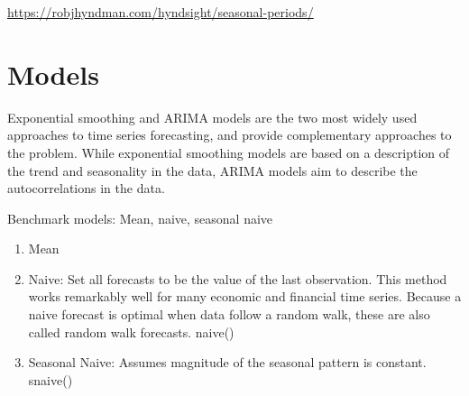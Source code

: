 \documentclass[]{book}
\newenvironment{Shaded}{\begin{snugshade}}{\end{snugshade}}
\newcommand{\KeywordTok}[1]{\textcolor[rgb]{0.13,0.29,0.53}{\textbf{#1}}}
\newcommand{\DataTypeTok}[1]{\textcolor[rgb]{0.13,0.29,0.53}{#1}}
\newcommand{\DecValTok}[1]{\textcolor[rgb]{0.00,0.00,0.81}{#1}}
\newcommand{\FloatTok}[1]{\textcolor[rgb]{0.00,0.00,0.81}{#1}}
\newcommand{\StringTok}[1]{\textcolor[rgb]{0.31,0.60,0.02}{#1}}
\newcommand{\OperatorTok}[1]{\textcolor[rgb]{0.81,0.36,0.00}{\textbf{#1}}}
\newcommand{\NormalTok}[1]{#1}
\begin{document}
\url{https://robjhyndman.com/hyndsight/seasonal-periods/}

\begin{Shaded}
\end{Shaded}

\section{Models}\label{models}

Exponential smoothing and ARIMA models are the two most widely used
approaches to time series forecasting, and provide complementary
approaches to the problem. While exponential smoothing models are based
on a description of the trend and seasonality in the data, ARIMA models
aim to describe the autocorrelations in the data.

Benchmark models: Mean, naive, seasonal naive

\begin{enumerate}
\def\labelenumi{\arabic{enumi}.}
\setcounter{enumi}{-1}
\item
  Mean
\item
  Naive: Set all forecasts to be the value of the last observation. This
  method works remarkably well for many economic and financial time
  series. Because a naive forecast is optimal when data follow a random
  walk, these are also called random walk forecasts. naive()
\item
  Seasonal Naive: Assumes magnitude of the seasonal pattern is constant.
  snaive()
\end{enumerate}
\end{document}

